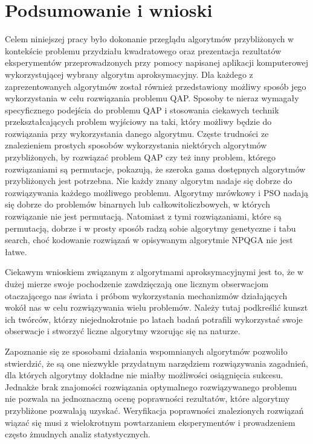 \chapter{Podsumowanie i wnioski}
\label{cha:wnioski}
Celem niniejszej pracy było dokonanie przeglądu algorytmów przybliżonych w kontekście problemu przydziału kwadratowego oraz prezentacja rezultatów eksperymentów przeprowadzonych przy pomocy napisanej aplikacji komputerowej wykorzystującej wybrany algorytm aproksymacyjny. Dla każdego z zaprezentowanych algorytmów został również przedstawiony możliwy sposób jego wykorzystania w celu rozwiązania problemu QAP. Sposoby te nieraz wymagały specyficznego podejścia do problemu QAP i stosowania ciekawych technik przekształcających problem wyjściowy na taki, który możliwy będzie do rozwiązania przy wykorzystania danego algorytmu. Częste trudności ze znalezieniem prostych sposobów wykorzystania niektórych algorytmów przybliżonych, by rozwiązać problem QAP czy też inny problem, którego rozwiązaniami są permutacje, pokazują, że szeroka gama dostępnych algorytmów przybliżonych jest potrzebna. Nie każdy znany algorytm nadaje się dobrze do rozwiązywania każdego możliwego problemu. Algorytmy mrówkowy i PSO nadają się dobrze do problemów binarnych lub całkowitoliczbowych, w których rozwiązanie nie jest permutacją. Natomiast z tymi rozwiązaniami, które są permutacją, dobrze i w prosty sposób radzą sobie algorytmy genetyczne i tabu search, choć kodowanie rozwiązań w opisywanym algorytmie NPQGA nie jest łatwe.

Ciekawym wnioskiem związanym z algorytmami aproksymacyjnymi jest to, że w dużej mierze swoje pochodzenie zawdzięczają one licznym obserwacjom otaczającego nas świata i próbom wykorzystania mechanizmów działających wokół nas w celu rozwiązywania wielu problemów. Należy tutaj podkreślić kunszt ich twórców, którzy niejednokrotnie po latach badań potrafili wykorzystać swoje obserwacje i stworzyć liczne algorytmy wzorując się na naturze.

Zapoznanie się ze sposobami działania wspomnianych algorytmów pozwoliło stwierdzić, że są one niezwykle przydatnym narzędziem rozwiązywania zagadnień, dla których algorytmy dokładne nie miałby możliwości osiągnięcia sukcesu. Jednakże brak znajomości rozwiązania optymalnego rozwiązywanego problemu nie pozwala na jednoznaczną ocenę poprawności rezultatów, które algorytmy przybliżone pozwalają uzyskać. Weryfikacja poprawności znalezionych rozwiązań wiązać się musi z wielokrotnym powtarzaniem eksperymentów i prowadzeniem często żmudnych analiz statystycznych. 

